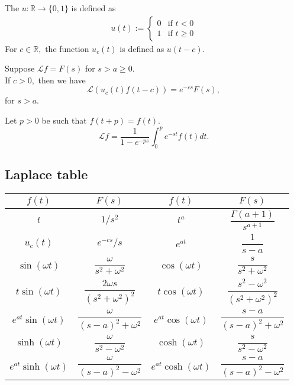 \begin{defn}
	The  $u:\mathbb{R}\to\{0, 1\}$ is defined as
	\begin{align*} 
		u(t) := \begin{cases}
			0 & \text{if } t < 0\\
			1 & \text{if } t \ge 0
		\end{cases}
	\end{align*}
	For $c \in \mathbb{R},$ the function $u_c(t)$ is defined as $u(t - c).$
\end{defn}

\begin{thm}
	Suppose $\mathcal{L}f = F(s)$ for $s > a \ge 0.$ \\
	If $c > 0,$ then we have
	\begin{equation*} 
		\mathcal{L}(u_c(t)f(t - c)) = e^{-cs}F(s),
	\end{equation*}
	for $s > a.$
\end{thm}

\begin{thm}
	Let $p > 0$ be such that $f(t + p) = f(t).$
	\begin{equation*} 
		\mathcal{L}f = \dfrac{1}{1 - e^{-ps}}\int_{0}^{p} e^{-st}f(t) dt.
	\end{equation*}
\end{thm}

\subsection{Laplace table}
\begin{center}
	\bgroup
	\def\arraystretch{2}
	\begin{tabular}{|c|c||c|c|} 
	\hline
	$f(t)$ & $F(s)$ & $f(t)$ & $F(s)$ \\
	\hline
	\hline
	$t$ & $1/s^2$ & $t^a$ & $\dfrac{\Gamma(a + 1)}{s^{a + 1}}$\\
	$u_c(t)$ & $e^{-cs}/s$ & $e^{at}$ & $\dfrac{1}{s - a}$\\
	$\sin(\omega t)$ & $\dfrac{\omega}{s^2 + \omega^2}$ & $\cos(\omega t)$ & $\dfrac{s}{s^2 + \omega^2}$\\
	$t\sin(\omega t)$ & $\dfrac{2\omega s}{(s^2 + \omega^2)^2}$ & $t\cos(\omega t)$ & $\dfrac{s^2 - \omega^2}{(s^2 + \omega^2)^2}$\\
	$e^{at}\sin(\omega t)$ & $\dfrac{\omega}{(s - a)^2 + \omega^2}$ & $e^{at}\cos(\omega t)$ & $\dfrac{s - a}{(s - a)^2 + \omega^2}$\\
	$\sinh(\omega t)$ & $\dfrac{\omega}{s^2 - \omega^2}$ & $\cosh(\omega t)$ & $\dfrac{s}{s^2 - \omega^2}$\\
	$e^{at}\sinh(\omega t)$ & $\dfrac{\omega}{(s - a)^2 - \omega^2}$ & $e^{at}\cosh(\omega t)$ & $\dfrac{s - a}{(s - a)^2 - \omega^2}$\\
	\hline
	\end{tabular}
	\egroup
\end{center}

